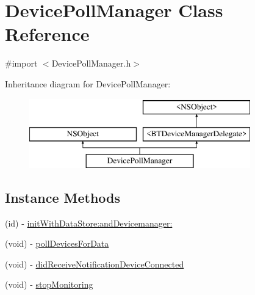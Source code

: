 \hypertarget{interface_device_poll_manager}{\section{Device\-Poll\-Manager Class Reference}
\label{interface_device_poll_manager}
}


{\ttfamily \#import $<$Device\-Poll\-Manager.\-h$>$}

Inheritance diagram for Device\-Poll\-Manager\-:\begin{figure}[H]
\begin{center}
\leavevmode
\includegraphics[height=3.000000cm]{interface_device_poll_manager}
\end{center}
\end{figure}
\subsection*{Instance Methods}
\begin{DoxyCompactItemize}
\item 
(id) -\/ \hyperlink{interface_device_poll_manager_ac1637206b4271575f8b2afd39375125b}{init\-With\-Data\-Store\-:and\-Devicemanager\-:}
\item 
(void) -\/ \hyperlink{interface_device_poll_manager_ac0c31de4251c9eac9b21594cc866f165}{poll\-Devices\-For\-Data}
\item 
(void) -\/ \hyperlink{interface_device_poll_manager_a91b7db2f338c98f0d653e8a33d95b736}{did\-Receive\-Notification\-Device\-Connected}
\item 
(void) -\/ \hyperlink{interface_device_poll_manager_a4fe6160b06d23999e8939c88e900b232}{stop\-Monitoring}
\end{DoxyCompactItemize}
